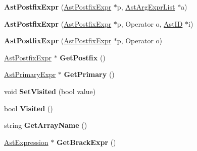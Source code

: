 \begin{DoxyCompactItemize}
\item 
\hypertarget{classAstPostfixExpr_a4a1ae7a03b7b29e6641f47479e58aa3b}{{\bfseries Ast\-Postfix\-Expr} (\hyperlink{classAstPostfixExpr}{Ast\-Postfix\-Expr} $\ast$p, \hyperlink{classAstArgExprList}{Ast\-Arg\-Expr\-List} $\ast$a)}\label{classAstPostfixExpr_a4a1ae7a03b7b29e6641f47479e58aa3b}

\item 
\hypertarget{classAstPostfixExpr_a094735e6e2f593a42cc2b9aabc44213b}{{\bfseries Ast\-Postfix\-Expr} (\hyperlink{classAstPostfixExpr}{Ast\-Postfix\-Expr} $\ast$p, Operator o, \hyperlink{classAstID}{Ast\-I\-D} $\ast$i)}\label{classAstPostfixExpr_a094735e6e2f593a42cc2b9aabc44213b}

\item 
\hypertarget{classAstPostfixExpr_a71f3baa5264259031d95741e65de1e07}{{\bfseries Ast\-Postfix\-Expr} (\hyperlink{classAstPostfixExpr}{Ast\-Postfix\-Expr} $\ast$p, Operator o)}\label{classAstPostfixExpr_a71f3baa5264259031d95741e65de1e07}

\item 
\hypertarget{classAstPostfixExpr_a2cac2396d2ad13b9b9af3832aac846be}{\hyperlink{classAstPostfixExpr}{Ast\-Postfix\-Expr} $\ast$ {\bfseries Get\-Postfix} ()}\label{classAstPostfixExpr_a2cac2396d2ad13b9b9af3832aac846be}

\item 
\hypertarget{classAstPostfixExpr_a646f9aa0e61d183640dc85ea0a07c91c}{\hyperlink{classAstPrimaryExpr}{Ast\-Primary\-Expr} $\ast$ {\bfseries Get\-Primary} ()}\label{classAstPostfixExpr_a646f9aa0e61d183640dc85ea0a07c91c}

\item 
\hypertarget{classAstPostfixExpr_a50dcbfd3bad3f563df90a9ad0b7e7238}{void {\bfseries Set\-Visited} (bool value)}\label{classAstPostfixExpr_a50dcbfd3bad3f563df90a9ad0b7e7238}

\item 
\hypertarget{classAstPostfixExpr_a5b6a44cfff4a5e5b5fd73ee2c308f743}{bool {\bfseries Visited} ()}\label{classAstPostfixExpr_a5b6a44cfff4a5e5b5fd73ee2c308f743}

\item 
\hypertarget{classAstPostfixExpr_ab2a5da9c586a9df484c40abe8144d31d}{string {\bfseries Get\-Array\-Name} ()}\label{classAstPostfixExpr_ab2a5da9c586a9df484c40abe8144d31d}

\item 
\hypertarget{classAstPostfixExpr_a3380286daa3e5312adeab9db059fe8ea}{\hyperlink{classAstExpression}{Ast\-Expression} $\ast$ {\bfseries Get\-Brack\-Expr} ()}\label{classAstPostfixExpr_a3380286daa3e5312adeab9db059fe8ea}


\end{DoxyCompactItemize}
